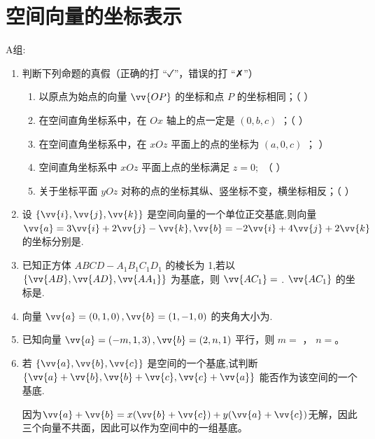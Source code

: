 \section*{空间向量的坐标表示}

A组:
\begin{enumerate}

\item 判断下列命题的真假（正确的打 “✓”，错误的打 “✗”）
\begin{enumerate}

    \item 以原点为始点的向量 $\vv{OP}$ 的坐标和点 $P$ 的坐标相同；（ ）

    \item 在空间直角坐标系中，在 ${Ox}$ 轴上的点一定是 $\left( {0,b,c}\right)$ ；（ ）

    \item 在空间直角坐标系中，在 ${xOz}$ 平面上的点的坐标为 $\left( {a,0,c}\right)$ ； ）

    \item 空间直角坐标系中 ${xOz}$ 平面上点的坐标满足 $z = 0;$ （ ）

    \item 关于坐标平面 ${yOz}$ 对称的点的坐标其纵、竖坐标不变，横坐标相反；（ ）

\end{enumerate}

    \item 设 $\left\{  {\vv{i},\vv{j},\vv{k}}\right\}$ 是空间向量的一个单位正交基底,则向量 $\vv{a} = 3\vv{i} + 2\vv{j} - \vv{k},\vv{b} =  - 2\vv{i} + 4\vv{j} + 2\vv{k}$ 的坐标分别是.

    \item 已知正方体 ${ABCD} - {A}_{1}{B}_{1}{C}_{1}{D}_{1}$ 的棱长为 1,若以 $\{ \vv{AB},\vv{AD},\vv{A{A}_{1}}\}$ 为基底，则 $\vv{A{C}_{1}}  =$ . $\vv{A{C}_{1}}$ 的坐标是.

    \item 向量 $\vv{a} = \left( {0,1,0}\right) ,\vv{b} = \left( {1, - 1,0}\right)$ 的夹角大小为.

    \item 已知向量 $\vv{a} = \left( {-m,1,3}\right) ,\vv{b} = \left( {2,n,1}\right)$ 平行，则 $m =$ ， $n =$。

    \item 若 $\{ \vv{a},\vv{b},\vv{c}\}$ 是空间的一个基底,试判断 $\{ \vv{a} + \vv{b},\vv{b} + \vv{c},\vv{c} + \vv{a}\}$ 能否作为该空间的一个基底.
    \begin{jieda}
        因为$\vv{a}+\vv{b}=x(\vv{b}+\vv{c})+y(\vv{a}+\vv{c})$无解，因此三个向量不共面，因此可以作为空间中的一组基底。
    \end{jieda}

\end{enumerate}


